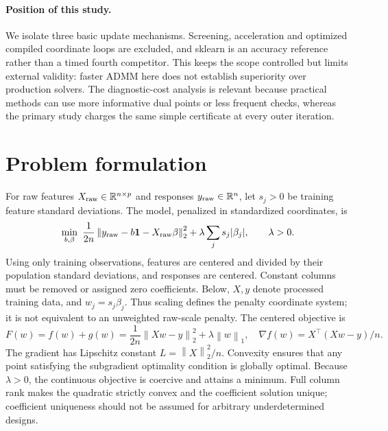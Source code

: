 \documentclass{article}
\newcommand{\R}{\mathbb{R}}
\newcommand{\norm}[1]{\left\|#1\right\|}
\begin{document}
\paragraph{Position of this study.} We isolate three basic update mechanisms. Screening, acceleration and optimized compiled coordinate loops are excluded, and sklearn is an accuracy reference rather than a timed fourth competitor. This keeps the scope controlled but limits external validity: faster ADMM here does not establish superiority over production solvers. The diagnostic-cost analysis is relevant because practical methods can use more informative dual points or less frequent checks, whereas the primary study charges the same simple certificate at every outer iteration.

\section{Problem formulation}
For raw features $X_{\rm raw}\in\R^{n\times p}$ and responses $y_{\rm raw}\in\R^n$, let $s_j>0$ be training feature standard deviations. The model, penalized in standardized coordinates, is
\begin{equation}
 \min_{b,\beta}\ \frac{1}{2n}\norm{y_{\rm raw}-b\mathbf{1}-X_{\rm raw}\beta}_2^2+\lambda\sum_j s_j|\beta_j|,
 \qquad \lambda>0.
\end{equation}
Using only training observations, features are centered and divided by their population standard deviations, and responses are centered. Constant columns must be removed or assigned zero coefficients. Below, $X,y$ denote processed training data, and $w_j=s_j\beta_j$. Thus scaling defines the penalty coordinate system; it is not equivalent to an unweighted raw-scale penalty. The centered objective is
\begin{equation}\label{eq:objective}
 F(w)=f(w)+g(w)=\frac{1}{2n}\norm{Xw-y}_2^2+\lambda\norm{w}_1,
 \quad \nabla f(w)=X^\top(Xw-y)/n.
\end{equation}
The gradient has Lipschitz constant $L=\norm{X}_2^2/n$. Convexity ensures that any point satisfying the subgradient optimality condition is globally optimal. Because $\lambda>0$, the continuous objective is coercive and attains a minimum. Full column rank makes the quadratic strictly convex and the coefficient solution unique; coefficient uniqueness should not be assumed for arbitrary underdetermined designs.
\end{document}
